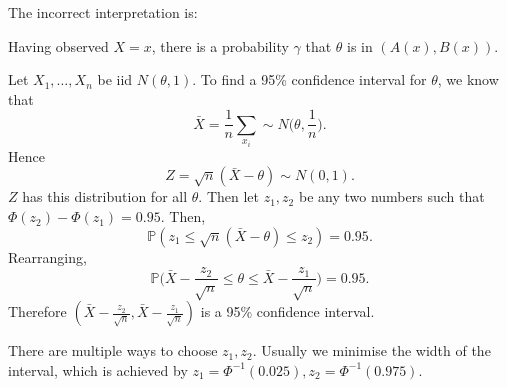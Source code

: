 \documentclass[12pt]{article}
\begin{document}
The incorrect interpretation is:
\begin{center}
	Having observed $X = x$, there is a probability $\gamma$ that $\theta$ is in $(A(x), B(x))$.
\end{center}

\begin{exbox}
	Let $X_1, \ldots, X_n$ be iid $N(\theta, 1)$. To find a 95\% confidence interval for $\theta$, we know that
	\[
	\bar X = \frac{1}{n} \sum_{x_i} \sim N\biggl(\theta, \frac{1}{n} \biggr)
	.\]
	Hence
	\[
		Z = \sqrt{n}(\bar X - \theta) \sim N(0,1)
	.\]
	$Z$ has this distribution for all $\theta$. Then let $z_1, z_2$ be any two numbers such that $\Phi(z_2) - \Phi(z_1) = 0.95$. Then,
	\[
	\mathbb{P}(z_1 \leq \sqrt n (\bar X - \theta) \leq z_2) = 0.95
	.\]
	Rearranging,
	\[
	\mathbb{P}\biggl( \bar X - \frac{z_2}{\sqrt n} \leq \theta \leq \bar X - \frac{z_1}{\sqrt n} \biggr) = 0.95
	.\]
	Therefore $(\bar X - \frac{z_2}{\sqrt{n}}, \bar X - \frac{z_1}{\sqrt n})$ is a 95\% confidence interval.

	There are multiple ways to choose $z_1, z_2$. Usually we minimise the width of the interval, which is achieved by $z_1 = \Phi^{-1} (0.025), z_2 = \Phi^{-1}(0.975)$.
\end{exbox}


\newpage

\printindex
\end{document}
